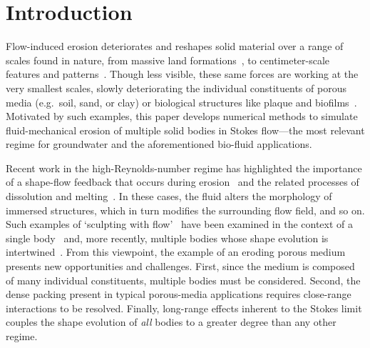\documentclass[preprint, 10pt]{elsarticle}
\begin{document}
\maketitle

\section{Introduction\label{s:intro}}
Flow-induced erosion deteriorates and reshapes solid material over a range of scales found in nature, from massive land formations~\cite{han1969, perron2009formation, abrams2009growth, petroff2011geometry, jerolmack2012internal, Rothman2012, coh-dev-sey-yi-szy-rot2015, perkins2015amplification}, to centimeter-scale features and patterns~\cite{daerr2003erosion, berhanu2012shape, nienhuis2014wavelength, domokos2014river}. Though less visible, these same forces are working at the very smallest scales, slowly deteriorating the individual constituents of porous media (e.g.~soil, sand, or clay) or biological structures like plaque and biofilms~\cite{pic-van-hei2000, sha2002, gro-gij-van-fer-hat-van-yua-wen2007}. Motivated by such examples, this paper develops numerical methods to simulate fluid-mechanical erosion of multiple solid bodies in Stokes flow---the most relevant regime for groundwater \cite{bear2013dynamics, cao2010coupled} and the aforementioned bio-fluid applications.

Recent work in the high-Reynolds-number regime has highlighted the importance of a shape-flow feedback that occurs during erosion~\cite{ris-moo-chi-she-zha2012, moo-ris-chi-zha-she2013, hewett2017evolution, moore2017riemann, lopez2018cfd} and the related processes of dissolution and melting~\cite{Huang2015, kondratiuk2015steadily, dallaston2015channelization, rycroft2016asymmetric, cohen2016erosion, hewett2017pear, claudin2017dissolution}.  In these cases, the fluid alters the morphology of immersed structures, which in turn modifies the surrounding flow field, and so on. Such examples of `sculpting with flow'~\cite{ristroph2018sculpting} have been examined in the context of a single body~\cite{ris-moo-chi-she-zha2012, moore2017riemann} and, more recently, multiple bodies whose shape evolution is intertwined~\cite{hewett2017evolution}. From this viewpoint, the example of an eroding porous medium presents new opportunities and challenges. First, since the medium is composed of many individual constituents, multiple bodies must be considered. Second, the dense packing present in typical porous-media applications requires close-range interactions to be resolved. Finally, long-range effects inherent to the Stokes limit couples the shape evolution of {\em all} bodies to a greater degree than any other regime.
\end{document}
